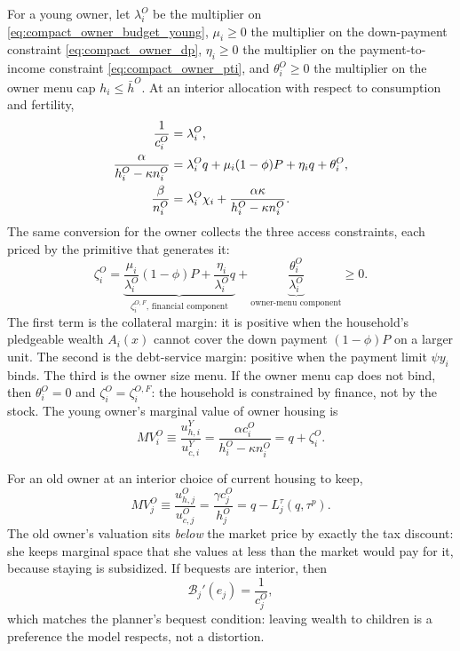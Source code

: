 \documentclass[11pt]{article}
\newcommand{\1}{\mathbf 1}
\begin{document}
For a young owner, let $\lambda_i^O$ be the multiplier on \eqref{eq:compact_owner_budget_young}, $\mu_i\ge0$ the multiplier on the down-payment constraint \eqref{eq:compact_owner_dp}, $\eta_i\ge0$ the multiplier on the payment-to-income constraint \eqref{eq:compact_owner_pti}, and $\theta_i^O\ge0$ the multiplier on the owner menu cap $h_i\le\bar h^O$. At an interior allocation with respect to consumption and fertility,
\begin{align}
\frac{1}{c_i^O}&=\lambda_i^O,
\notag\\
\frac{\alpha}{h_i^O-\kappa n_i^O}
&=
\lambda_i^O q+
\mu_i(1-\phi)P+
\eta_i q+
\theta_i^O,
\notag\\
\frac{\beta}{n_i^O}
&=
\lambda_i^O\chi_i+\frac{\alpha\kappa}{h_i^O-\kappa n_i^O}.
\label{eq:compact_owner_foc_n}
\end{align}
The same conversion for the owner collects the three access constraints, each priced by the primitive that generates it:
\[
\zeta_i^O
=
\underbrace{\frac{\mu_i}{\lambda_i^O}(1-\phi)P+
\frac{\eta_i}{\lambda_i^O}q}_{\zeta_i^{O,F}\text{, financial component}}
+
\underbrace{\frac{\theta_i^O}{\lambda_i^O}}_{\text{owner-menu component}}
\ge0.
\]
The first term is the collateral margin: it is positive when the household's pledgeable wealth $A_i(x)$ cannot cover the down payment $(1-\phi)P$ on a larger unit. The second is the debt-service margin: positive when the payment limit $\psi y_i$ binds. The third is the owner size menu. If the owner menu cap does not bind, then $\theta_i^O=0$ and $\zeta_i^O=\zeta_i^{O,F}$: the household is constrained by finance, not by the stock. The young owner's marginal value of owner housing is
\begin{equation}
MV_i^O
\equiv
\frac{u^Y_{h,i}}{u^Y_{c,i}}
=
\frac{\alpha c_i^O}{h_i^O-\kappa n_i^O}
=
q+\zeta_i^O.
\label{eq:compact_owner_mv}
\end{equation}

For an old owner at an interior choice of current housing to keep,
\begin{equation}
MV_j^O
\equiv
\frac{u^O_{h,j}}{u^O_{c,j}}
=
\frac{\gamma c_j^O}{h_j^O}
=
q-L_j^\tau(q,\tau^p).
\label{eq:compact_old_mv}
\end{equation}
The old owner's valuation sits \emph{below} the market price by exactly the tax discount: she keeps marginal space that she values at less than the market would pay for it, because staying is subsidized. If bequests are interior, then
\[
\mathcal B_j'(e_j)=\frac{1}{c_j^O},
\]
which matches the planner's bequest condition: leaving wealth to children is a preference the model respects, not a distortion.
\end{document}
